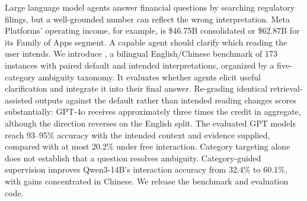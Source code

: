 Large language model agents answer financial questions by searching regulatory filings, but a well-grounded number can reflect the wrong interpretation. Meta Platforms' operating income, for example, is \$46.75B consolidated or \$62.87B for its Family of Apps segment. A capable agent should clarify which reading the user intends. We introduce \fininteract, a bilingual English/Chinese benchmark of 173 instances with paired default and intended interpretations, organized by a five-category ambiguity taxonomy. It evaluates whether agents elicit useful clarification and integrate it into their final answer. Re-grading identical retrieval-assisted outputs against the default rather than intended reading changes scores substantially: GPT-4o receives approximately three times the credit in aggregate, although the direction reverses on the English split. The evaluated GPT models reach 93--95\% accuracy with the intended context and evidence supplied, compared with at most 20.2\% under free interaction. Category targeting alone does not establish that a question resolves ambiguity. Category-guided supervision improves Qwen3-14B's interaction accuracy from 32.4\% to 60.1\%, with gains concentrated in Chinese. We release the benchmark and evaluation code.
